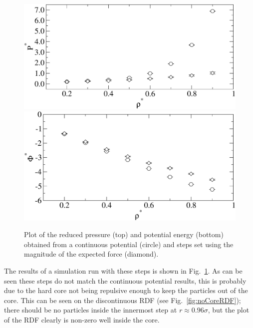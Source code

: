 \documentclass[12pt]{UoAthesis} \usepackage{booktabs}
\begin{document}
\begin{figure}[htp] 
  \begin{center}
    \includegraphics[clip,scale=0.45]{figures/actionNoCoreP} 
    \includegraphics[clip,scale=0.45]{figures/actionNoCoreU} 
    \caption[Comparison of results from a continuous potential and
    those using steps set using the magnitude of the expected force]
    {Plot of the reduced pressure (top) and potential energy (bottom)
      obtained from a continuous potential (circle) and steps set
      using the magnitude of the expected force (diamond).}
    \label{fig:actionNoCore}
  \end{center}
\end{figure}

The results of a simulation run with these steps is shown in
Fig.~\ref{fig:actionNoCore}. As can be seen these steps do not match
the continuous potential results, this is probably due to the hard
core not being repulsive enough to keep the particles out of the core.
This can be seen on the discontinuous RDF (see
Fig.~\ref{fig:noCoreRDF}); there should be no particles inside the
innermost step at $r\approx 0.96\sigma$, but the plot of the RDF
clearly is non-zero well inside the core.
\end{document}
